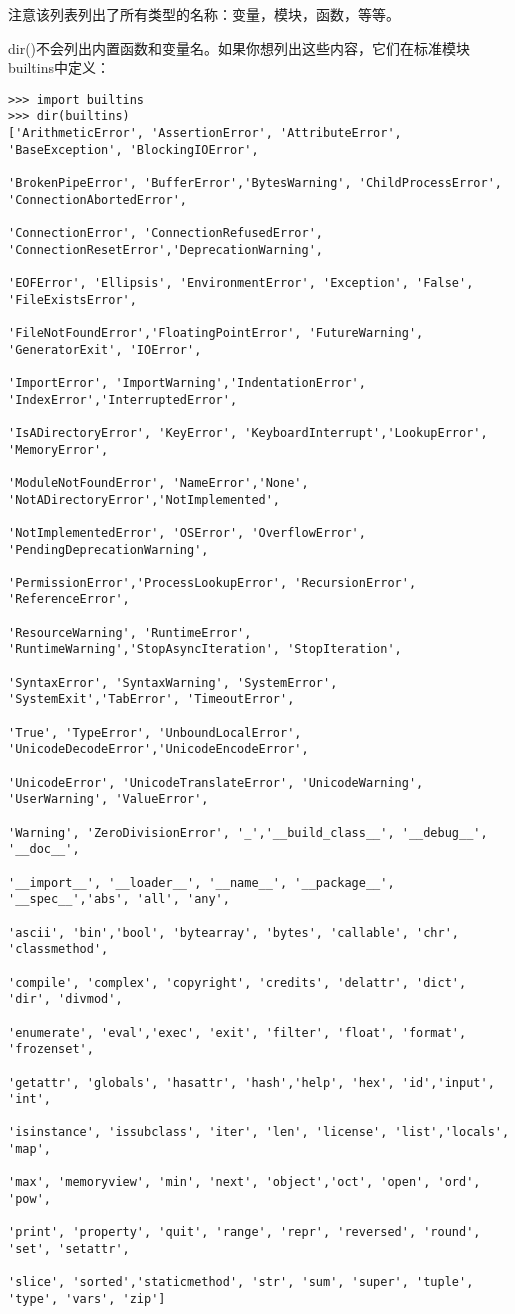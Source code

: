 \documentclass[UTF8]{ctexart}
\begin{document}
注意该列表列出了所有类型的名称：变量，模块，函数，等等。

dir()不会列出内置函数和变量名。如果你想列出这些内容，它们在标准模块builtins中定义：
\begin{verbatim}
>>> import builtins
>>> dir(builtins)
['ArithmeticError', 'AssertionError', 'AttributeError', 'BaseException', 'BlockingIOError',

'BrokenPipeError', 'BufferError','BytesWarning', 'ChildProcessError', 'ConnectionAbortedError',

'ConnectionError', 'ConnectionRefusedError', 'ConnectionResetError','DeprecationWarning',

'EOFError', 'Ellipsis', 'EnvironmentError', 'Exception', 'False', 'FileExistsError',

'FileNotFoundError','FloatingPointError', 'FutureWarning', 'GeneratorExit', 'IOError',

'ImportError', 'ImportWarning','IndentationError', 'IndexError','InterruptedError',

'IsADirectoryError', 'KeyError', 'KeyboardInterrupt','LookupError', 'MemoryError',

'ModuleNotFoundError', 'NameError','None', 'NotADirectoryError','NotImplemented',

'NotImplementedError', 'OSError', 'OverflowError', 'PendingDeprecationWarning',

'PermissionError','ProcessLookupError', 'RecursionError', 'ReferenceError',

'ResourceWarning', 'RuntimeError', 'RuntimeWarning','StopAsyncIteration', 'StopIteration',

'SyntaxError', 'SyntaxWarning', 'SystemError', 'SystemExit','TabError', 'TimeoutError',

'True', 'TypeError', 'UnboundLocalError', 'UnicodeDecodeError','UnicodeEncodeError',

'UnicodeError', 'UnicodeTranslateError', 'UnicodeWarning', 'UserWarning', 'ValueError',

'Warning', 'ZeroDivisionError', '_','__build_class__', '__debug__', '__doc__',

'__import__', '__loader__', '__name__', '__package__', '__spec__','abs', 'all', 'any',

'ascii', 'bin','bool', 'bytearray', 'bytes', 'callable', 'chr', 'classmethod',

'compile', 'complex', 'copyright', 'credits', 'delattr', 'dict', 'dir', 'divmod',

'enumerate', 'eval','exec', 'exit', 'filter', 'float', 'format', 'frozenset',

'getattr', 'globals', 'hasattr', 'hash','help', 'hex', 'id','input', 'int',

'isinstance', 'issubclass', 'iter', 'len', 'license', 'list','locals', 'map',

'max', 'memoryview', 'min', 'next', 'object','oct', 'open', 'ord', 'pow',

'print', 'property', 'quit', 'range', 'repr', 'reversed', 'round', 'set', 'setattr',

'slice', 'sorted','staticmethod', 'str', 'sum', 'super', 'tuple', 'type', 'vars', 'zip']
\end{verbatim}
\end{document}
